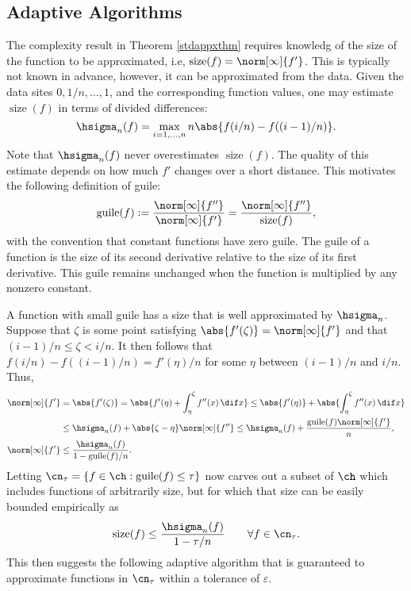 \documentclass[12pt]{amsart}
\DeclareMathOperator{\size}{size}
\DeclareMathOperator{\guile}{guile}
\begin{document}
\subsection{Adaptive Algorithms}

The complexity result in Theorem \ref{stdappxthm} requires knowledg of the size of the function to be approximated, i.e, $\size(f) = \norm[\infty]{f'}$.  This is typically not known in advance, however, it can be approximated from the data. Given the data sites $0, 1/n, \dots, 1$, and the corresponding function values, one may estimate $\size(f)$ in terms of divided differences:
\begin{equation}
\hsigma_n(f)= \max_{i=1, \ldots, n} n\abs{f(i/n)-f((i-1)/n)}.
\end{equation}
Note that $\hsigma_n(f)$ never overestimates $\size(f)$.  The quality of this estimate depends on how much $f'$ changes over a short distance.  This motivates the following definition of guile:
\begin{equation}
\guile(f):= \frac{\norm[\infty]{f''}}{\norm[\infty]{f'}} = \frac{\norm[\infty]{f''}}{\size(f)},
\end{equation}
with the convention that constant functions have zero guile.  The guile of a function is the size of its second derivative relative to the size of its first derivative.  This guile remains unchanged when the function is multiplied by any nonzero constant.

A function with small guile has a size that is well approximated by $\hsigma_n$.  Suppose that $\zeta$ is some point satisfying $\abs{f'(\zeta)} = \norm[\infty]{f'}$ and that $(i-1)/n \le \zeta < i/n$.  It then follows that $f(i/n)-f((i-1)/n) = f'(\eta)/n$ for some $\eta$ between $(i-1)/n$ and $i/n$.  Thus,
\begin{align*}
\norm[\infty]{f'} &= \abs{f'(\zeta)} = \abs{f'(\eta) + \int_{\eta}^{\zeta} f''(x) \, \dif x} \le \abs{f'(\eta)} + \abs{\int_{\eta}^{\zeta} f''(x) \, \dif x} \\
& \le \hsigma_n(f) + \abs{\zeta - \eta} \norm[\infty]{f''} \le \hsigma_n(f) + \frac{\guile(f) \norm[\infty]{f'}}{n}, \\
\norm[\infty]{f'} & \le \frac{\hsigma_n(f)}{1 - \guile(f)/n}.
\end{align*}
Letting $\cn_{\tau} = \{ f \in \ch : \guile(f) \le \tau\}$ now carves out a subset of $\ch$ which includes functions of arbitrarily size, but for which that size can be easily bounded empirically as
\begin{equation} \label{sizebd}
\size(f) \le \frac{\hsigma_n(f)}{1 - \tau/n} \qquad \forall f \in \cn_{\tau}.
\end{equation}
This then suggests the following adaptive algorithm that is guaranteed to approximate functions in $\cn_{\tau}$ within a tolerance of $\varepsilon$.
\end{document}
